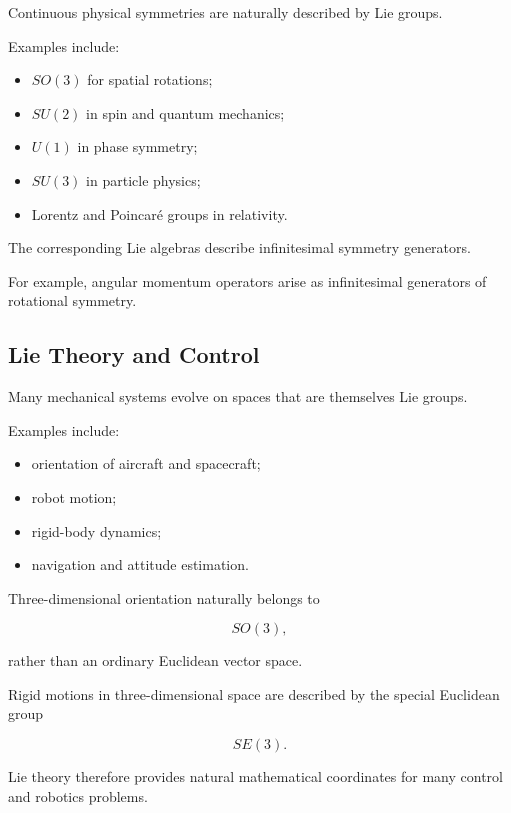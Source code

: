 Continuous physical symmetries are naturally described by Lie groups.

Examples include:

\begin{itemize}
    \item \(SO(3)\) for spatial rotations;
    \item \(SU(2)\) in spin and quantum mechanics;
    \item \(U(1)\) in phase symmetry;
    \item \(SU(3)\) in particle physics;
    \item Lorentz and Poincaré groups in relativity.
\end{itemize}

The corresponding Lie algebras describe infinitesimal symmetry generators.

For example, angular momentum operators arise as infinitesimal generators of
rotational symmetry.

\subsection{Lie Theory and Control}
\label{subsec:lie-theory-control}

Many mechanical systems evolve on spaces that are themselves Lie groups.

Examples include:

\begin{itemize}
    \item orientation of aircraft and spacecraft;
    \item robot motion;
    \item rigid-body dynamics;
    \item navigation and attitude estimation.
\end{itemize}

Three-dimensional orientation naturally belongs to

\[ SO(3), \]

rather than an ordinary Euclidean vector space.

Rigid motions in three-dimensional space are described by the special
Euclidean group

\[ SE(3). \]

Lie theory therefore provides natural mathematical coordinates for many
control and robotics problems.

